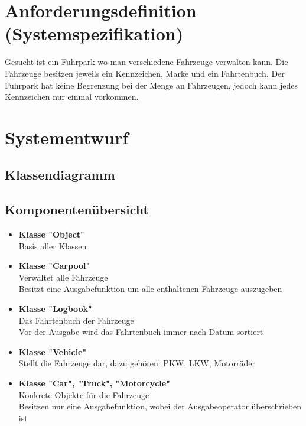\section{Anforderungsdefinition (Systemspezifikation)}

Gesucht ist ein Fuhrpark wo man verschiedene Fahrzeuge verwalten kann. Die Fahrzeuge besitzen jeweils ein Kennzeichen, Marke und ein Fahrtenbuch.
Der Fuhrpark hat keine Begrenzung bei der Menge an Fahrzeugen, jedoch kann jedes Kennzeichen nur einmal vorkommen. 


\section{Systementwurf}

\subsection{Klassendiagramm}
  

\subsection{Komponentenübersicht}

\begin{itemize}

\item \textbf{Klasse \string"Object"} \\
Basis aller Klassen

\item \textbf{Klasse "Carpool"}
\\ Verwaltet alle Fahrzeuge
\\ Besitzt eine Ausgabefunktion um alle enthaltenen Fahrzeuge auszugeben

\item \textbf{Klasse "Logbook"}
\\ Das Fahrtenbuch der Fahrzeuge
\\ Vor der Ausgabe wird das Fahrtenbuch immer nach Datum sortiert

\item \textbf{Klasse "Vehicle"}
\\ Stellt die Fahrzeuge dar, dazu gehören: PKW, LKW, Motorräder

\item \textbf{Klasse "Car", "Truck", "Motorcycle"}
\\ Konkrete Objekte für die Fahrzeuge
\\ Besitzen nur eine Ausgabefunktion, wobei der Ausgabeoperator überschrieben ist

\end{itemize}

